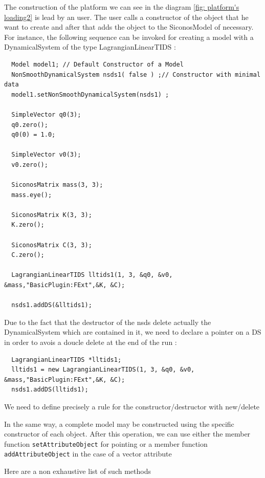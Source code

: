 The construction of the platform we can see in the diagram \ref{fig: platform's loading2} is lead by an user. The user calls a constructor of the object that he want to create and after that adds the object to the SiconosModel of necessary. For instance, the following sequence can be invoked for creating a model with a DynamicalSystem of the type LagrangianLinearTIDS :

\begin{verbatim}
  Model model1; // Default Constructor of a Model
  NonSmoothDynamicalSystem nsds1( false ) ;// Constructor with minimal data 
  model1.setNonSmoothDynamicalSystem(nsds1) ;
        
  SimpleVector q0(3);
  q0.zero();
  q0(0) = 1.0;
                
  SimpleVector v0(3);
  v0.zero();      
        
  SiconosMatrix mass(3, 3);
  mass.eye();

  SiconosMatrix K(3, 3);
  K.zero();
                
  SiconosMatrix C(3, 3);
  C.zero();

  LagrangianLinearTIDS lltids1(1, 3, &q0, &v0, &mass,"BasicPlugin:FExt",&K, &C);

  nsds1.addDS(&lltids1);

\end{verbatim}


\begin{ndr}
  Due to the fact that the destructor of the nsds delete actually the DynamicalSystem which are contained in it, we need to declare a pointer on a DS in  order to avois a doucle delete at the end of the run :
\begin{verbatim}
  LagrangianLinearTIDS *lltids1;
  lltids1 = new LagrangianLinearTIDS(1, 3, &q0, &v0, &mass,"BasicPlugin:FExt",&K, &C);
  nsds1.addDS(lltids1);
\end{verbatim}

We need to define precisely a rule for the constructor/destructor with new/delete

\end{ndr}


In the same way,  a complete model may be constructed using the specific constructor of each object. After this operation, we can use either the member function \texttt{setAttributeObject} for pointing or  a member function  \texttt{addAttributeObject} in the case of a vector attribute

 Here are a non exhaustive list of such methods

